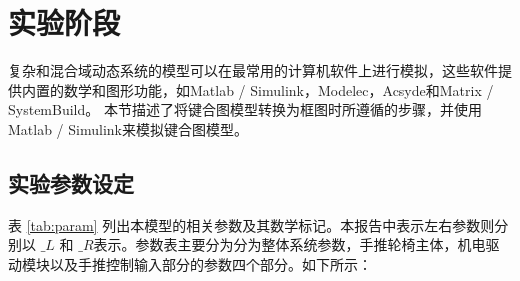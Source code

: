 \clearpage
\section{实验阶段}

复杂和混合域动态系统的模型可以在最常用的计算机软件上进行模拟，这些软件提供内置的数学和图形功能，如Matlab / Simulink，Modelec，Acsyde和Matrix / SystemBuild。 本节描述了将键合图模型转换为框图时所遵循的步骤，并使用Matlab / Simulink来模拟键合图模型。

\subsection{实验参数设定}

表 \ref{tab:param} 列出本模型的相关参数及其数学标记。本报告中表示左右参数则分别以 $ \_L $ 和 $ \_R $表示。参数表主要分为分为整体系统参数，手推轮椅主体，机电驱动模块以及手推控制输入部分的参数四个部分。如下所示：

